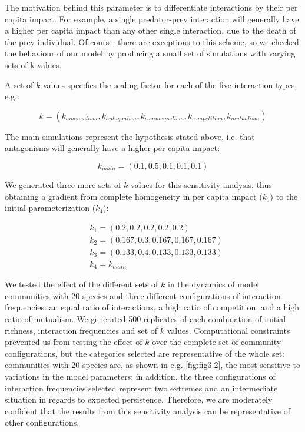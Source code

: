 The motivation behind this parameter is to differentiate interactions by their per capita impact. For example, a single predator-prey interaction will generally have a higher per capita impact than any other single interaction, due to the death of the prey individual. Of course, there are exceptions to this scheme, so we checked the behaviour of our model by producing a small set of simulations with varying sets of k values.

A set of $k$ values specifies the scaling factor for each of the five interaction types, e.g.:

\[k = (k_{amensalism}, k_{antagonism}, k_{commensalism}, k_{competition}, k_{mutualism})\]

The main simulations represent the hypothesis stated above, i.e. that antagonisms will generally have a higher per capita impact:

\[k_{main} = (0.1,0.5,0.1,0.1,0.1)\]

We generated three more sets of $k$ values for this sensitivity analysis, thus obtaining a gradient from complete homogeneity in per capita impact (\(k_1\)) to the initial parameterization (\(k_4\)):

\begin{align*}
& k_1 = (0.2,0.2,0.2,0.2,0.2)\\
& k_2 = (0.167,0.3,0.167,0.167,0.167)\\
& k_3 = (0.133,0.4,0.133,0.133,0.133)\\
& k_4 = k_{main}
\end{align*}

We tested the effect of the different sets of \(k\) in the dynamics of model communities with 20 species and three different configurations of interaction frequencies: an equal ratio of interactions, a high ratio of competition, and a high ratio of mutualism. We generated 500 replicates of each combination of initial richness, interaction frequencies and set of \(k\) values. Computational constraints prevented us from testing the effect of \(k\) over the complete set of community configurations, but the categories selected are representative of the whole set: communities with 20 species are, as shown in e.g. \ref{fig:fig3.2}, the most sensitive to variations in the model parameters; in addition, the three configurations of interaction frequencies selected represent two extremes and an intermediate situation in regards to expected persistence. Therefore, we are moderately confident that the results from this sensitivity analysis can be representative of other configurations.

